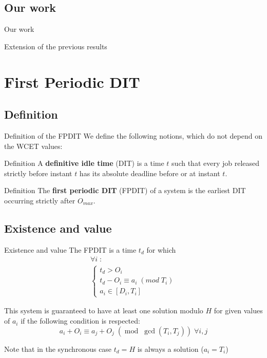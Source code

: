\documentclass{beamer}
\begin{document}
	\subsection{Our work}

	\begin{frame}{Our work}

	Extension of the previous results

	\end{frame}

\section{First Periodic DIT}

	\subsection{Definition}

	\begin{frame}{Definition of the FPDIT}
		We define the following notions, which do not depend on the WCET values:
		\begin{block}{Definition}
			A \textbf{definitive idle time} (DIT) \cite{lipariaverage} is a time $t$ such that every job
			released strictly before instant $t$ has its absolute deadline before or at instant $t$.
		\end{block}
		\begin{block}{Definition}
			The \textbf{first periodic DIT} (FPDIT) of a system is the earliest DIT occurring
			strictly after $O_{max}$.
		\end{block}

	\end{frame}

	\subsection{Existence and value}

	\begin{frame}{Existence and value}
		The FPDIT is a time $t_d$ for which
		\[
			\begin{array}{l}
				\forall i \; :\\
				\left\{
					\begin{array}{l}
						t_d > O_i \\
						t_d - O_i \equiv a_i \; (mod \; T_i) \\
						a_i \in [D_i, T_i]
					\end{array}
				\right.
			\end{array}
		\]

		This system is guaranteed to have at least one solution modulo $H$ for given
		values of $a_i$ if the following condition is respected:
		\[
			a_i + O_i \equiv a_j + O_j \; (\operatorname{mod} \; \operatorname{gcd}(T_i,
			T_j)) \; \forall i,j
		\]

		Note that in the synchronous case $t_d = H$ is always a solution ($a_i = T_i$)
	\end{frame}
\end{document}
